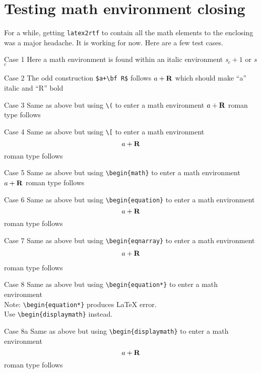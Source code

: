 \documentclass{article}
\begin{document}
\section{Testing math environment closing}

For a while, getting \texttt{latex2rtf} to contain all the math elements
to the enclosing was a major headache.  It is working for now.  Here are
a few test cases.

Case 1 Here a math environment is found within an italic environment
\textit{s$_c+1$} or {\it s$_c$}

Case 2 The odd construction \verb#$a+\bf R$# follows $a+\bf R$ which
should make ``a'' italic and ``R'' bold

Case 3 Same as above but using \verb#\(# to enter a math environment
\(a+\bf R\) roman type follows

Case 4 Same as above but using \verb#\[# to enter a math environment \[a+\bf R\] 
roman type follows

Case 5 Same as above but using \verb#\begin{math}# to enter a math environment
\begin{math}a+\bf R\end{math} roman type follows

Case 6 Same as above but using \verb#\begin{equation}# to enter a math environment
\begin{equation}a+ \bf R\end{equation} roman type follows

Case 7 Same as above but using \verb#\begin{eqnarray}# to enter a math environment
\begin{eqnarray}a+ \bf R\end{eqnarray} roman type follows

Case 8 Same as above but using \verb#\begin{equation*}# to enter a math environment \\
Note: \verb#\begin{equation*}# produces LaTeX error.\\
Use \verb#\begin{displaymath}# instead.

Case 8a Same as above but using \verb#\begin{displaymath}# to enter a math environment
\begin{displaymath}a+ \bf R\end{displaymath} roman type follows
\end{document}
